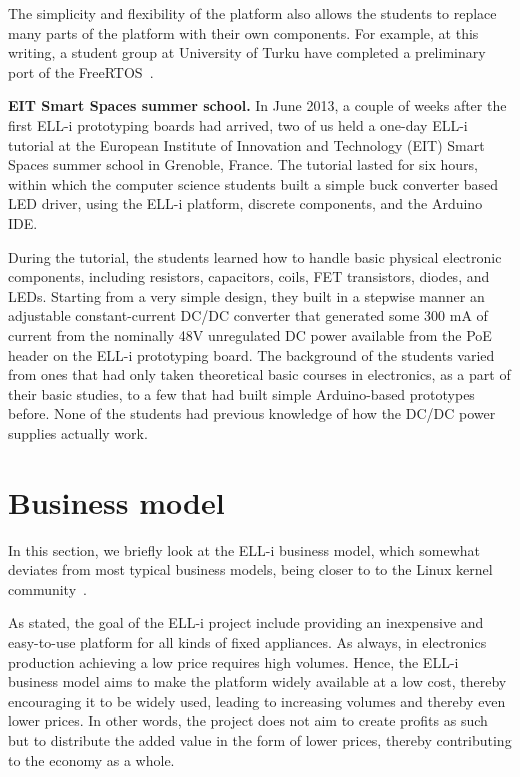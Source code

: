 \documentclass[final]{siamltex}
\begin{document}
The simplicity and flexibility of the platform also allows the
students to replace many parts of the platform with their own
components.  For example, at this writing, a student group at
University of Turku have completed a preliminary port of the
FreeRTOS~\cite{barry2008freertos}.

{\bf EIT Smart Spaces summer school.}
In June 2013, a couple of weeks after the first ELL-i prototyping
boards had arrived, two of us held a one-day ELL-i tutorial at the
European Institute of Innovation and Technology (EIT) Smart Spaces
summer school in Grenoble, France.  The tutorial lasted for six hours,
within which the computer science students built a simple buck
converter based LED driver, using the ELL-i platform, discrete
components, and the Arduino IDE.

During the tutorial, the students learned how to handle basic physical
electronic components, including resistors, capacitors, coils, FET
transistors, diodes, and LEDs.  Starting from a very simple design,
they built in a stepwise manner an adjustable constant-current DC/DC
converter that generated some 300 mA of current from the nominally 48V
unregulated DC power available from the PoE header on the ELL-i
prototyping board.  The background of the students varied from ones
that had only taken theoretical basic courses in electronics, as a
part of their basic studies, to a few that had built simple
Arduino-based prototypes before.  None of the students had previous
knowledge of how the DC/DC power supplies actually work.


\section{Business model}
\label{sec:business}

In this section, we briefly look at the ELL-i business model, which somewhat
deviates from most typical business models, being closer to to the Linux kernel
community~\cite{hertel2003motivation, lee2003firm}.

As stated, the goal of the ELL-i project include providing an
inexpensive and easy-to-use platform for all kinds of fixed
appliances.  As always, in electronics production achieving a low
price requires high volumes.  Hence, the ELL-i business model aims to
make the platform widely available at a low cost, thereby encouraging
it to be widely used, leading to increasing volumes and thereby even
lower prices.  In other words, the project does not aim to
create profits as such but to distribute the added value in the form
of lower prices, thereby contributing to the economy as a whole.
\end{document}
